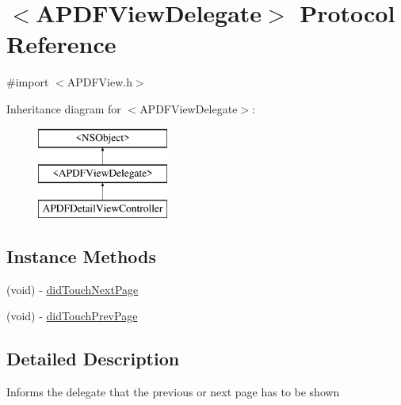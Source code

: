 \hypertarget{protocol_a_p_d_f_view_delegate-p}{\section{$<$A\-P\-D\-F\-View\-Delegate$>$ Protocol Reference}
\label{protocol_a_p_d_f_view_delegate-p}
}


{\ttfamily \#import $<$A\-P\-D\-F\-View.\-h$>$}

Inheritance diagram for $<$A\-P\-D\-F\-View\-Delegate$>$\-:\begin{figure}[H]
\begin{center}
\leavevmode
\includegraphics[height=3.000000cm]{protocol_a_p_d_f_view_delegate-p}
\end{center}
\end{figure}
\subsection*{Instance Methods}
\begin{DoxyCompactItemize}
\item 
(void) -\/ \hyperlink{protocol_a_p_d_f_view_delegate-p_a70a52e1ddb1111089679a3013ce5faf0}{did\-Touch\-Next\-Page}
\item 
(void) -\/ \hyperlink{protocol_a_p_d_f_view_delegate-p_a8eafe808da9d29e89b9e26ec1b0815c5}{did\-Touch\-Prev\-Page}
\end{DoxyCompactItemize}


\subsection{Detailed Description}
Informs the delegate that the previous or next page has to be shown 

